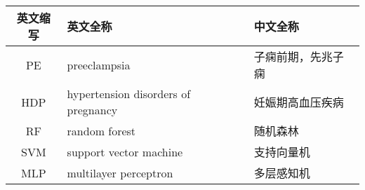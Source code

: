 \cleardoublepage
{}
\begin{table}[htbp]
    \centering
    \fontsize{10}{6}
    \begin{tabularx}{\linewidth}{cX<{\centering}X<{\centering}}
        \toprule \textbf{英文缩写}&\textbf{英文全称}&\textbf{中文全称}\\
        \midrule PE&preeclampsia&子痫前期，先兆子痫\\
        HDP&hypertension disorders of pregnancy&妊娠期高血压疾病\\
        RF&random forest&随机森林\\
        SVM&support vector machine&支持向量机\\
        MLP&multilayer perceptron&多层感知机\\
        \bottomrule
    \end{tabularx}
\end{table}